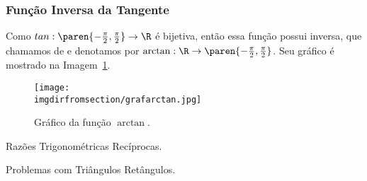 \subsubsection{Função Inversa da Tangente}

\begin{example}
Como $tan: \paren{- \frac {\pi} 2, \frac {\pi} 2} \to \R$ é
bijetiva, então essa função possui inversa, que chamamos de
 e denotamos por $\arctan : \R \to
\paren{- \frac {\pi} 2, \frac {\pi} 2}$. Seu gráfico é mostrado na Imagem~\ref{img:grafico-arctan}.
%
\begin{figure}[H]
\centering
\texttt{[image: \\imgdirfromsection/grafarctan.jpg]}
\caption{Gráfico da função $\arctan$.}
\label{img:grafico-arctan}
\end{figure}
\end{example}

\begin{onlineact}
    {Razões Trigonométricas Recíprocas}.
\end{onlineact}

\begin{onlineact}
    {Problemas com Triângulos Retângulos}.
\end{onlineact}